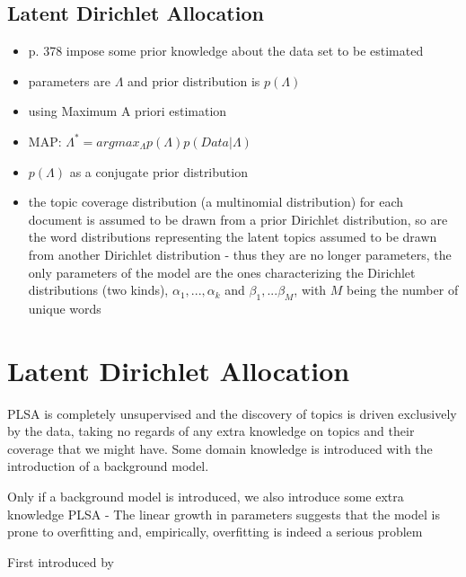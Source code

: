 \documentclass[11pt,a4paper,english,oneside]{book}
\numberwithin{equation}{chapter}
\begin{document}
\subsection{Latent Dirichlet Allocation}\label{LDA}

\begin{itemize}
	\item p. 378 impose some prior knowledge about the data set to be estimated
	\item parameters are $\Lambda$ and prior distribution is $p(\Lambda)$
	\item using Maximum A priori estimation
	\item MAP: $\Lambda^* = arg max_{\Lambda}p(\Lambda)p(Data|\Lambda)$
	\item $p(\Lambda)$ as a conjugate prior distribution
	\item the topic coverage distribution (a multinomial distribution) for each document is assumed to be drawn from a prior Dirichlet distribution, so are the word distributions representing the latent topics assumed to be drawn from another Dirichlet distribution - thus they are no longer parameters, the only parameters of the model are the ones characterizing the Dirichlet distributions (two kinds), $\alpha_1, ... , \alpha_k$ and $\beta_1, ... \beta_M$, with $M$ being the number of unique words
\end{itemize}



\section{Latent Dirichlet Allocation}








PLSA is completely unsupervised and the discovery of topics is driven exclusively by the data, taking no regards of any extra knowledge on topics and their coverage that we might have. Some domain knowledge is introduced with the introduction of a background model. 

 Only if a background model is introduced, we also introduce some extra knowledge 
PLSA - The linear growth in parameters suggests that the model is prone to overfitting and, empirically, overfitting is indeed a serious problem \cite[p. 1001]{Blei.2003}

First introduced by \cite{Blei.2003}
\end{document}
